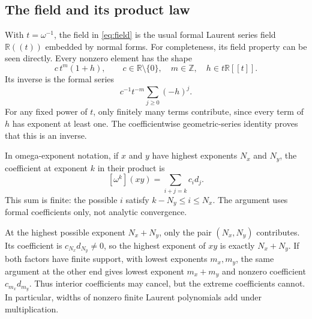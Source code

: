 \documentclass[11pt,letterpaper]{article}
\numberwithin{equation}{section}
\theoremstyle{definition}
\theoremstyle{remark}
\newcommand{\R}{\mathbb{R}}
\newcommand{\Z}{\mathbb{Z}}
\begin{document}
\subsection{The field and its product law}
With $t=\omega^{-1}$, the field in \eqref{eq:field} is the usual formal Laurent
series field $\R((t))$ embedded by normal forms. For completeness, its field
property can be seen directly. Every nonzero element has the shape
\[
 c\,t^m(1+h),\qquad c\in\R\setminus\{0\},\quad
 m\in\Z,\quad h\in t\R[[t]].
\]
Its inverse is the formal series
\[
 c^{-1}t^{-m}\sum_{j\geq0}(-h)^j.
\]
For any fixed power of $t$, only finitely many terms contribute, since every
term of $h$ has exponent at least one. The coefficientwise geometric-series
identity proves that this is an inverse.

In omega-exponent notation, if $x$ and $y$ have highest exponents $N_x$ and
$N_y$, the coefficient at exponent $k$ in their product is
\[
 [\omega^k](xy)=\sum_{i+j=k}c_i d_j.
\]
This sum is finite: the possible $i$ satisfy $k-N_y\leq i\leq N_x$.
The argument uses formal coefficients only, not analytic convergence.

At the highest possible exponent $N_x+N_y$, only the pair $(N_x,N_y)$
contributes. Its coefficient is $c_{N_x}d_{N_y}\ne0$, so the highest exponent
of $xy$ is exactly $N_x+N_y$. If both factors have finite support, with
lowest exponents $m_x,m_y$, the same argument at the other end gives lowest
exponent $m_x+m_y$ and nonzero coefficient $c_{m_x}d_{m_y}$. Thus interior
coefficients may cancel, but the extreme coefficients cannot. In particular,
widths of nonzero finite Laurent polynomials add under multiplication.
\end{document}

